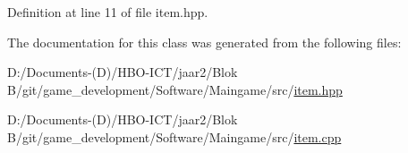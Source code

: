Definition at line 11 of file item.\+hpp.



The documentation for this class was generated from the following files\+:\begin{DoxyCompactItemize}
\item 
D\+:/\+Documents-\/(\+D)/\+H\+B\+O-\/\+I\+C\+T/jaar2/\+Blok B/git/game\+\_\+development/\+Software/\+Maingame/src/\hyperlink{item_8hpp}{item.\+hpp}\item 
D\+:/\+Documents-\/(\+D)/\+H\+B\+O-\/\+I\+C\+T/jaar2/\+Blok B/git/game\+\_\+development/\+Software/\+Maingame/src/\hyperlink{item_8cpp}{item.\+cpp}\end{DoxyCompactItemize}
